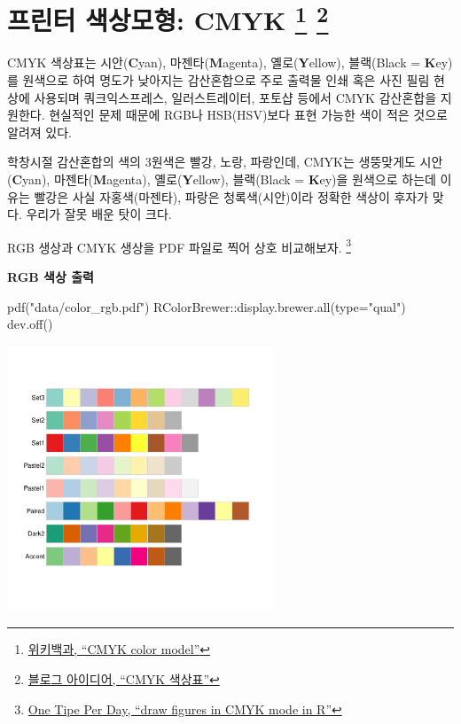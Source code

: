 \documentclass[
  letterpaper,
]{book}
\newenvironment{Shaded}{\begin{snugshade}}{\end{snugshade}}
\newcommand{\AttributeTok}[1]{\textcolor[rgb]{0.40,0.45,0.13}{#1}}
\newcommand{\FunctionTok}[1]{\textcolor[rgb]{0.28,0.35,0.67}{#1}}
\newcommand{\NormalTok}[1]{\textcolor[rgb]{0.00,0.23,0.31}{#1}}
\newcommand{\SpecialCharTok}[1]{\textcolor[rgb]{0.37,0.37,0.37}{#1}}
\newcommand{\StringTok}[1]{\textcolor[rgb]{0.13,0.47,0.30}{#1}}
\begin{document}
\hypertarget{viz-printer-cmyk}{%
\section[프린터 색상모형: CMYK ]{\texorpdfstring{프린터 색상모형: CMYK
\footnote{\href{https://en.wikipedia.org/wiki/CMYK_color_model}{위키백과,
  ``CMYK color model''}}
\footnote{\href{https://blogidea.tistory.com/101}{블로그 아이디어,
  ``CMYK 색상표''}}}{프린터 색상모형: CMYK  }}\label{viz-printer-cmyk}}

CMYK 색상표는 시안(\textbf{C}yan), 마젠타(\textbf{M}agenta),
옐로(\textbf{Y}ellow), 블랙(Black = \textbf{K}ey)를 원색으로 하여 명도가
낮아지는 감산혼합으로 주로 출력물 인쇄 혹은 사진 필림 현상에 사용되며
쿼크익스프레스, 일러스트레이터, 포토샵 등에서 CMYK 감산혼합을 지원한다.
현실적인 문제 때문에 RGB나 HSB(HSV)보다 표현 가능한 색이 적은 것으로
알려져 있다.

학창시절 감산혼합의 색의 3원색은 빨강, 노랑, 파랑인데, CMYK는 생뚱맞게도
시안(\textbf{C}yan), 마젠타(\textbf{M}agenta), 옐로(\textbf{Y}ellow),
블랙(Black = \textbf{K}ey)을 원색으로 하는데 이유는 빨강은 사실
자홍색(마젠타), 파랑은 청록색(시안)이라 정확한 색상이 후자가 맞다.
우리가 잘못 배운 탓이 크다.

RGB 생상과 CMYK 생상을 PDF 파일로 찍어 상호 비교해보자. \footnote{\href{http://onetipperday.sterding.com/2012/10/draw-figures-in-cmyk-mode-in-r.html}{One
  Tipe Per Day, ``draw figures in CMYK mode in R''}}

\textbf{RGB 색상 출력}

\begin{Shaded}
\begin{Highlighting}[]
\FunctionTok{pdf}\NormalTok{(}\StringTok{"data/color\_rgb.pdf"}\NormalTok{)}
\NormalTok{RColorBrewer}\SpecialCharTok{::}\FunctionTok{display.brewer.all}\NormalTok{(}\AttributeTok{type=}\StringTok{"qual"}\NormalTok{)}
\FunctionTok{dev.off}\NormalTok{()}
\end{Highlighting}
\end{Shaded}

\includegraphics[width=3.125in,height=3.125in]{data/color_rgb.pdf}
\end{document}

